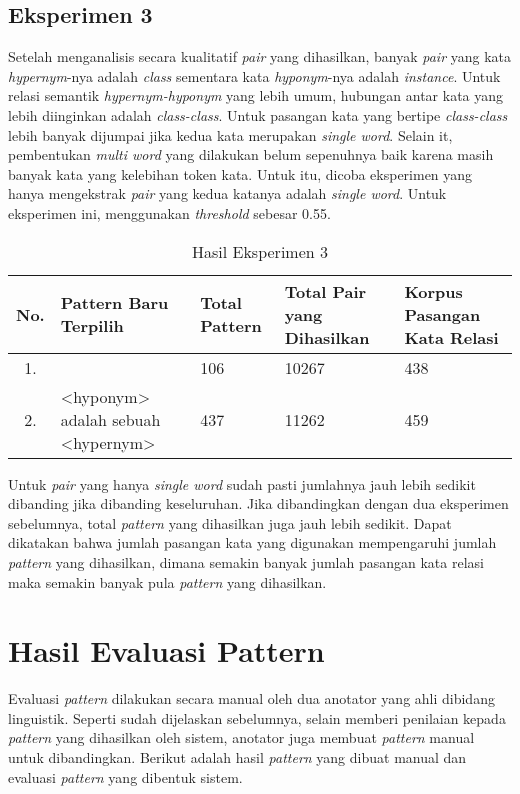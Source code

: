 \subsection{Eksperimen 3}
Setelah menganalisis secara kualitatif \textit{pair} yang dihasilkan, banyak \textit{pair} yang kata \textit{hypernym}-nya adalah \textit{class} sementara kata \textit{hyponym}-nya adalah \textit{instance}. Untuk relasi semantik \textit{hypernym-hyponym} yang lebih umum, hubungan antar kata yang lebih diinginkan adalah \textit{class-class}. Untuk pasangan kata yang bertipe \textit{class-class} lebih banyak dijumpai jika kedua kata merupakan \textit{single word}. Selain it, pembentukan \textit{multi word} yang dilakukan belum sepenuhnya baik karena masih banyak kata yang kelebihan token kata. Untuk itu, dicoba eksperimen yang hanya mengekstrak \textit{pair} yang kedua katanya adalah \textit{single word}. Untuk eksperimen ini, menggunakan \textit{threshold} sebesar 0.55.
\begin{table}
  \centering
  \caption{Hasil Eksperimen 3}
  \label{table:eksp3}
  \begin{tabular}{|c|m{14em}|m{4em}|m{4em}|m{4em}|}
    \hline
      No. & Pattern Baru Terpilih & Total Pattern & Total Pair yang Dihasilkan & Korpus Pasangan Kata Relasi \\ \hline
      1.  &                                            & 106  &  10267   &  438  \\ \hline
      2.  & <hyponym> adalah sebuah <hypernym>         & 437  &  11262   &  459 \\ \hline
  \end{tabular}
\end{table}

\noindent Untuk \textit{pair} yang hanya \textit{single word} sudah pasti jumlahnya jauh lebih sedikit dibanding jika dibanding keseluruhan. Jika dibandingkan dengan dua eksperimen sebelumnya, total \textit{pattern} yang dihasilkan juga jauh lebih sedikit. Dapat dikatakan bahwa jumlah pasangan kata yang digunakan mempengaruhi jumlah \textit{pattern} yang dihasilkan, dimana semakin banyak jumlah pasangan kata relasi maka semakin banyak pula \textit{pattern} yang dihasilkan.


\section{Hasil Evaluasi Pattern}
Evaluasi \textit{pattern} dilakukan secara manual oleh dua anotator yang ahli dibidang linguistik. Seperti sudah dijelaskan sebelumnya, selain memberi penilaian kepada \textit{pattern} yang dihasilkan oleh sistem, anotator juga membuat \textit{pattern} manual untuk dibandingkan. Berikut adalah hasil \textit{pattern} yang dibuat manual dan evaluasi \textit{pattern} yang dibentuk sistem.

